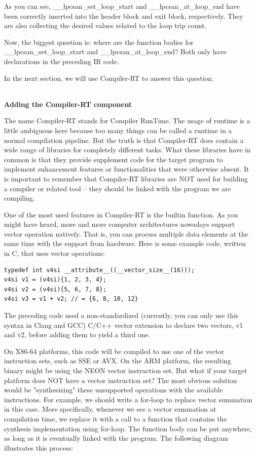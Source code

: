 As you can see, \_\_lpcsan\_set\_loop\_start and \_\_lpcsan\_at\_loop\_end have been correctly inserted into the header block and exit block, respectively. They are also collecting the desired values related to the loop trip count.

Now, the biggest question is: where are the function bodies for \_\_lpcsan\_set\_loop\_start and \_\_lpcsan\_at\_loop\_end? Both only have declarations in the preceding IR code.

In the next section, we will use Compiler-RT to answer this question.

\hspace*{\fill} \\ %
\noindent
\textbf{Adding the Compiler-RT component}

The name Compiler-RT stands for Compiler RunTime. The usage of runtime is a little ambiguous here because too many things can be called a runtime in a normal compilation pipeline. But the truth is that Compiler-RT does contain a wide range of libraries for completely different tasks. What these libraries have in common is that they provide supplement code for the target program to implement enhancement features or functionalities that were otherwise absent. It is important to remember that Compiler-RT libraries are NOT used for building a compiler or related tool – they should be linked with the program we are compiling.

One of the most used features in Compiler-RT is the builtin function. As you might have heard, more and more computer architectures nowadays support vector operation natively. That is, you can process multiple data elements at the same time with the support from hardware. Here is some example code, written in C, that uses vector operations:

\begin{lstlisting}[style=styleCXX]
typedef int v4si __attribute__((__vector_size__(16)));
v4si v1 = (v4si){1, 2, 3, 4};
v4si v2 = (v4si){5, 6, 7, 8};
v4si v3 = v1 + v2; // = {6, 8, 10, 12}
\end{lstlisting}


The preceding code used a non-standardized (currently, you can only use this syntax in Clang and GCC) C/C++ vector extension to declare two vectors, v1 and v2, before adding them to yield a third one.

On X86-64 platforms, this code will be compiled to use one of the vector instruction sets, such as SSE or AVX. On the ARM platform, the resulting binary might be using the NEON vector instruction set. But what if your target platform does NOT have a vector instruction set? The most obvious solution would be "synthesizing" these unsupported operations with the available instructions. For example, we should write a for-loop to replace vector summation in this case. More specifically, whenever we see a vector summation at compilation time, we replace it with a call to a function that contains the synthesis implementation using for-loop. The function body can be put anywhere, as long as it is eventually linked with the program. The following diagram illustrates this process:

